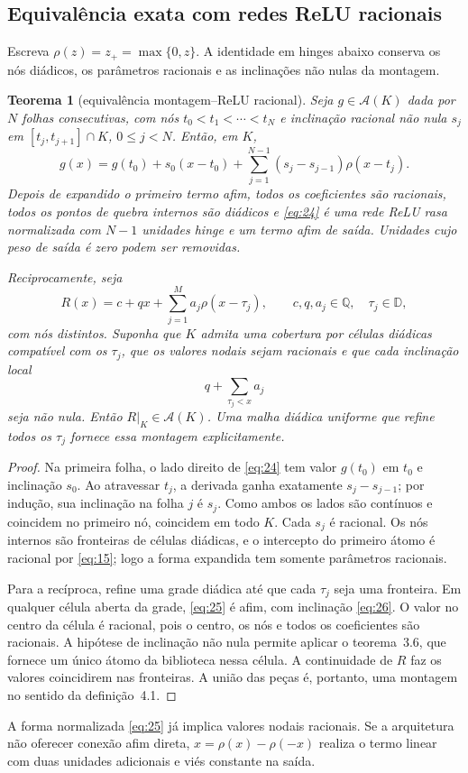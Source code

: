 \documentclass[11pt,a4paper]{article}
\theoremstyle{preciso}
\newtheorem{teorema}{Teorema}[section]
\theoremstyle{definition}
\newcommand{\Q}{\mathbb Q}
\newcommand{\D}{\mathbb D}
\newcommand{\Asm}{\mathcal A}
\newcommand{\eqn}[2]{\begin{equation}\label{eq:#1}#2\end{equation}}
\begin{document}
\subsection{Equivalência exata com redes ReLU racionais}
Escreva $\rho(z)=z_+=\max\{0,z\}$. A identidade em hinges abaixo conserva os nós diádicos, os parâmetros racionais e as inclinações não nulas da montagem.
\begin{teorema}[equivalência montagem--ReLU racional]
Seja $g\in\Asm(K)$ dada por $N$ folhas consecutivas, com nós $t_0<t_1<\cdots<t_N$ e inclinação racional não nula $s_j$ em $[t_j,t_{j+1}]\cap K$, $0\le j<N$. Então, em $K$,
\eqn{24}{g(x)=g(t_0)+s_0(x-t_0)+\sum_{j=1}^{N-1}(s_j-s_{j-1})\rho(x-t_j).}
Depois de expandido o primeiro termo afim, todos os coeficientes são racionais, todos os pontos de quebra internos são diádicos e \eqref{eq:24} é uma rede ReLU rasa normalizada com $N-1$ unidades hinge e um termo afim de saída. Unidades cujo peso de saída é zero podem ser removidas.

Reciprocamente, seja
\eqn{25}{R(x)=c+qx+\sum_{j=1}^Ma_j\rho(x-\tau_j),\qquad c,q,a_j\in\Q,\quad\tau_j\in\D,}
com nós distintos. Suponha que $K$ admita uma cobertura por células diádicas compatível com os $\tau_j$, que os valores nodais sejam racionais e que cada inclinação local
\eqn{26}{q+\sum_{\tau_j<x}a_j}
seja não nula. Então $R|_K\in\Asm(K)$. Uma malha diádica uniforme que refine todos os $\tau_j$ fornece essa montagem explicitamente.
\end{teorema}
\begin{proof}
Na primeira folha, o lado direito de \eqref{eq:24} tem valor $g(t_0)$ em $t_0$ e inclinação $s_0$. Ao atravessar $t_j$, a derivada ganha exatamente $s_j-s_{j-1}$; por indução, sua inclinação na folha $j$ é $s_j$. Como ambos os lados são contínuos e coincidem no primeiro nó, coincidem em todo $K$. Cada $s_j$ é racional. Os nós internos são fronteiras de células diádicas, e o intercepto do primeiro átomo é racional por \eqref{eq:15}; logo a forma expandida tem somente parâmetros racionais.

Para a recíproca, refine uma grade diádica até que cada $\tau_j$ seja uma fronteira. Em qualquer célula aberta da grade, \eqref{eq:25} é afim, com inclinação \eqref{eq:26}. O valor no centro da célula é racional, pois o centro, os nós e todos os coeficientes são racionais. A hipótese de inclinação não nula permite aplicar o teorema~3.6, que fornece um único átomo da biblioteca nessa célula. A continuidade de $R$ faz os valores coincidirem nas fronteiras. A união das peças é, portanto, uma montagem no sentido da definição~4.1.
\end{proof}
A forma normalizada \eqref{eq:25} já implica valores nodais racionais. Se a arquitetura não oferecer conexão afim direta, $x=\rho(x)-\rho(-x)$ realiza o termo linear com duas unidades adicionais e viés constante na saída.
\end{document}
